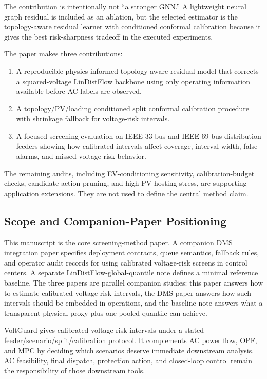\documentclass[
  preprint,12pt]{elsarticle}
\providecommand{\tightlist}{%
  \setlength{\itemsep}{0pt}\setlength{\parskip}{0pt}}
\begin{document}
The contribution is intentionally not ``a stronger GNN.'' A lightweight
neural graph residual is included as an ablation, but the selected
estimator is the topology-aware residual learner with conditioned
conformal calibration because it gives the best risk-sharpness tradeoff
in the executed experiments.

The paper makes three contributions:

\begin{enumerate}
\def\labelenumi{\arabic{enumi}.}
\tightlist
\item
  A reproducible physics-informed topology-aware residual model that
  corrects a squared-voltage LinDistFlow backbone using only operating
  information available before AC labels are observed.
\item
  A topology/PV/loading conditioned split conformal calibration
  procedure with shrinkage fallback for voltage-risk intervals.
\item
  A focused screening evaluation on IEEE 33-bus and IEEE 69-bus
  distribution feeders showing how calibrated intervals affect coverage,
  interval width, false alarms, and missed-voltage-risk behavior.
\end{enumerate}

The remaining audits, including EV-conditioning sensitivity,
calibration-budget checks, candidate-action pruning, and high-PV hosting
stress, are supporting application extensions. They are not used to
define the central method claim.

\subsection{Scope and Companion-Paper
Positioning}\label{scope-and-companion-paper-positioning}

This manuscript is the core screening-method paper. A companion DMS
integration paper specifies deployment contracts, queue semantics,
fallback rules, and operator audit records for using calibrated
voltage-risk screens in control centers. A separate
LinDistFlow-global-quantile note defines a minimal reference baseline.
The three papers are parallel companion studies: this paper answers how
to estimate calibrated voltage-risk intervals, the DMS paper answers how
such intervals should be embedded in operations, and the baseline note
answers what a transparent physical proxy plus one pooled quantile can
achieve.

VoltGuard gives calibrated voltage-risk intervals under a stated
feeder/scenario/split/calibration protocol. It complements AC power
flow, OPF, and MPC by deciding which scenarios deserve immediate
downstream analysis. AC feasibility, final dispatch, protection action,
and closed-loop control remain the responsibility of those downstream
tools.
\end{document}
